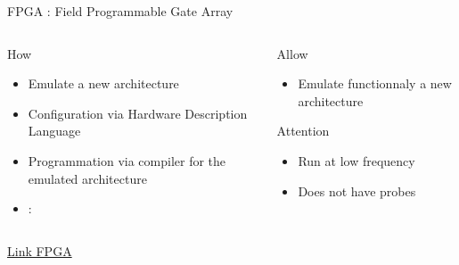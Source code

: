 %
\begin{Frame}{FPGA : Field Programmable Gate Array}
  \begin{columns}[t]
    \begin{column}{5cm} %
      \begin{block}{How}
        \begin{itemize}
        \item Emulate a new architecture
        \item Configuration via Hardware Description Language
        \item Programmation via compiler for the emulated architecture
        \item  : 
        \end{itemize}
      \end{block} 
    \end{column}
    
    \begin{column}{5cm} %
      \begin{block}{Allow}
        \begin{itemize}
      \item Emulate functionnaly a new architecture
        \end{itemize}
      \end{block}   
      \begin{alertblock}{Attention}
        \begin{itemize}
        \item Run at low frequency
        \item Does not have probes
        \end{itemize}
      \end{alertblock}
    \end{column}
  \end{columns} 
\href{https://en.wikipedia.org/wiki/Programmable_logic_device}{Link FPGA}
\end{Frame}


